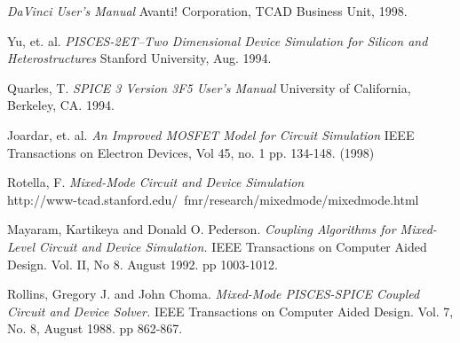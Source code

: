

\begin{thebibliography}{1}

\emph{DaVinci User's Manual}
\newblock Avanti! Corporation, TCAD Business Unit, 1998.

Yu, et. al.
\emph{PISCES-2ET--Two Dimensional Device Simulation for Silicon and
  Heterostructures}
\newblock Stanford University, Aug. 1994.

Quarles, T.
\emph{SPICE 3 Version 3F5 User's Manual}
\newblock University of California, Berkeley, CA. 1994.

Joardar, et. al.
\emph{An Improved MOSFET Model for Circuit Simulation}
\newblock IEEE Transactions on Electron Devices, Vol 45, no. 1
pp. 134-148. (1998)

Rotella, F.
\emph{Mixed-Mode Circuit and Device Simulation} \\
\newblock http://www-tcad.stanford.edu/~fmr/research/mixedmode/mixedmode.html

Mayaram, Kartikeya and Donald O. Pederson.
\emph{Coupling Algorithms for Mixed-Level Circuit and Device Simulation.}
\newblock IEEE Transactions on Computer Aided Design. Vol. II, No 8.  August
1992. pp 1003-1012.

Rollins, Gregory J. and John Choma.
\emph{Mixed-Mode PISCES-SPICE Coupled Circuit and Device Solver.}
\newblock IEEE Transactions on Computer Aided Design. Vol. 7, No. 8, August
1988.  pp 862-867.

\end{thebibliography}
